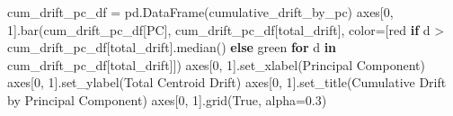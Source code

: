 \documentclass[
  letterpaper,
  DIV=11,
  numbers=noendperiod]{scrartcl}
\newenvironment{Shaded}{\begin{snugshade}}{\end{snugshade}}
\newcommand{\ControlFlowTok}[1]{\textcolor[rgb]{0.00,0.23,0.31}{\textbf{#1}}}
\newcommand{\DecValTok}[1]{\textcolor[rgb]{0.68,0.00,0.00}{#1}}
\newcommand{\FloatTok}[1]{\textcolor[rgb]{0.68,0.00,0.00}{#1}}
\newcommand{\KeywordTok}[1]{\textcolor[rgb]{0.00,0.23,0.31}{\textbf{#1}}}
\newcommand{\NormalTok}[1]{\textcolor[rgb]{0.00,0.23,0.31}{#1}}
\newcommand{\OperatorTok}[1]{\textcolor[rgb]{0.37,0.37,0.37}{#1}}
\newcommand{\StringTok}[1]{\textcolor[rgb]{0.13,0.47,0.30}{#1}}
\newcommand{\VariableTok}[1]{\textcolor[rgb]{0.07,0.07,0.07}{#1}}
\renewenvironment{Shaded}{%
  \begin{tcolorbox}[%
    enhanced,%
    colback=codebg,%
    colframe=codebg,%
    borderline west={3pt}{0pt}{sectionblue},%
    fontupper=\small\ttfamily,%
    boxrule=0pt,%
    arc=0pt,%
    boxsep=5pt,%
    left=2mm,%
    right=2mm,%
    top=2mm,%
    bottom=2mm%
  ]%
}{%
  \end{tcolorbox}%
}
\begin{document}
\begin{Shaded}
\begin{Highlighting}[]
\NormalTok{cum\_drift\_pc\_df }\OperatorTok{=}\NormalTok{ pd.DataFrame(cumulative\_drift\_by\_pc)}
\NormalTok{axes[}\DecValTok{0}\NormalTok{, }\DecValTok{1}\NormalTok{].bar(cum\_drift\_pc\_df[}\StringTok{\textquotesingle{}PC\textquotesingle{}}\NormalTok{], cum\_drift\_pc\_df[}\StringTok{\textquotesingle{}total\_drift\textquotesingle{}}\NormalTok{], }
\NormalTok{               color}\OperatorTok{=}\NormalTok{[}\StringTok{\textquotesingle{}red\textquotesingle{}} \ControlFlowTok{if}\NormalTok{ d }\OperatorTok{\textgreater{}}\NormalTok{ cum\_drift\_pc\_df[}\StringTok{\textquotesingle{}total\_drift\textquotesingle{}}\NormalTok{].median() }\ControlFlowTok{else} \StringTok{\textquotesingle{}green\textquotesingle{}} 
                      \ControlFlowTok{for}\NormalTok{ d }\KeywordTok{in}\NormalTok{ cum\_drift\_pc\_df[}\StringTok{\textquotesingle{}total\_drift\textquotesingle{}}\NormalTok{]])}
\NormalTok{axes[}\DecValTok{0}\NormalTok{, }\DecValTok{1}\NormalTok{].set\_xlabel(}\StringTok{\textquotesingle{}Principal Component\textquotesingle{}}\NormalTok{)}
\NormalTok{axes[}\DecValTok{0}\NormalTok{, }\DecValTok{1}\NormalTok{].set\_ylabel(}\StringTok{\textquotesingle{}Total Centroid Drift\textquotesingle{}}\NormalTok{)}
\NormalTok{axes[}\DecValTok{0}\NormalTok{, }\DecValTok{1}\NormalTok{].set\_title(}\StringTok{\textquotesingle{}Cumulative Drift by Principal Component\textquotesingle{}}\NormalTok{)}
\NormalTok{axes[}\DecValTok{0}\NormalTok{, }\DecValTok{1}\NormalTok{].grid(}\VariableTok{True}\NormalTok{, alpha}\OperatorTok{=}\FloatTok{0.3}\NormalTok{)}


\end{Highlighting}
\end{Shaded}
\end{document}
